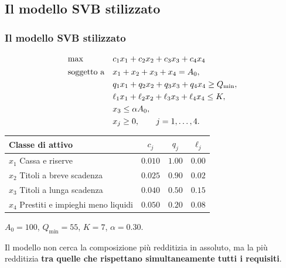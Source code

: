 



\subsection{Il modello SVB stilizzato}%

\begin{frame}%
%

\frametitle{Il modello SVB stilizzato}%
%

%


{\small
\[%
\begin{array}
[c]{ll}%
\max & c_{1}x_{1}+c_{2}x_{2}+c_{3}x_{3}+c_{4}x_{4}\\[4pt]%
\text{soggetto a} & x_{1}+x_{2}+x_{3}+x_{4}=A_{0},\\[3pt]
& q_{1}x_{1}+q_{2}x_{2}+q_{3}x_{3}+q_{4}x_{4}\geq Q_{\min},\\[3pt]
& \ell_{1}x_{1}+\ell_{2}x_{2}+\ell_{3}x_{3}+\ell_{4}x_{4}\leq K,\\[3pt]
& x_{3}\leq\alpha A_{0},\\[3pt]
& x_{j}\geq0,\qquad j=1,\ldots,4.
\end{array}
\]
}

\medskip

\begin{center}
{\small
\begin{tabular}
[c]{lccc}\hline
\textbf{Classe di attivo} & $c_{j}$ & $q_{j}$ & $\ell_{j}$\\\hline
$x_{1}$ Cassa e riserve & $0.010$ & $1.00$ & $0.00$\\
$x_{2}$ Titoli a breve scadenza & $0.025$ & $0.90$ & $0.02$\\
$x_{3}$ Titoli a lunga scadenza & $0.040$ & $0.50$ & $0.15$\\
$x_{4}$ Prestiti e impieghi meno liquidi & $0.050$ & $0.20$ & $0.08$\\\hline
\end{tabular}
}
\end{center}

\smallskip

\begin{center}
{\small $A_{0}=100$, \quad$Q_{\min}=55$, \quad$K=7$, \quad$\alpha=0.30$.
\smallskip}
\end{center}

{\small Il modello non cerca la composizione pi\`{u} redditizia in assoluto,
ma la pi\`{u} redditizia \textbf{tra quelle che rispettano simultaneamente
tutti i requisiti}.}%

\transboxout
\end{frame}%


